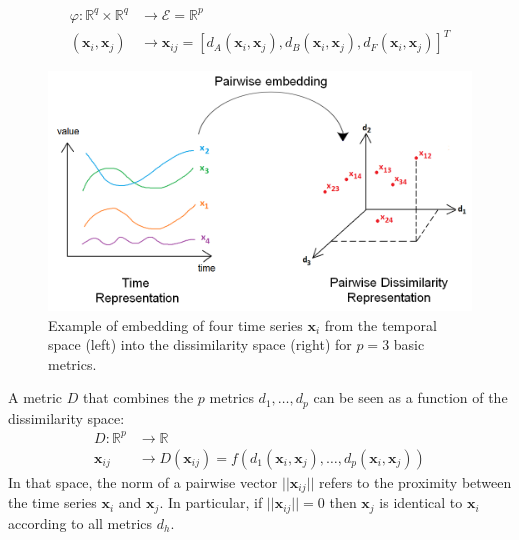 \begin{equation}
\begin{aligned}
\varphi : \mathbb{R}^q \times \mathbb{R}^q & \rightarrow \mathcal{E} = \mathbb{R}^p \\
(\textbf{x}_i, \textbf{x}_j) & \rightarrow \textbf{x}_{ij} = [d_A(\textbf{x}_i, \textbf{x}_j), d_B(\textbf{x}_i, \textbf{x}_j), d_F(\textbf{x}_i, \textbf{x}_j)]^T
\end{aligned}
\label{eq:projection}
\end{equation}

%
%

%

\begin{figure}[h!]
	\begin{minipage}[b]{1.0\linewidth}
		\centering
		\includegraphics[width=0.78\linewidth]{images/PairwiseEmbedding2}
	\end{minipage}
	\caption{Example of embedding of four time series $\textbf{x}_i$ from the temporal space (left) into the dissimilarity space (right) for $p=3$ basic metrics.}
	\label{fig:PairwiseEmbedding}
\end{figure}

\noindent A metric $D$ that combines the $p$ metrics $d_1, \ldots, d_p$ can be seen as a function of the dissimilarity space:
\begin{equation}
\begin{aligned}
D : \mathbb{R}^p & \rightarrow \mathbb{R} \\
\textbf{x}_{ij} & \rightarrow D(\textbf{x}_{ij}) = f(d_1(\textbf{x}_i, \textbf{x}_j), \ldots , d_p(\textbf{x}_i, \textbf{x}_j))
\end{aligned}
\label{eq:metric}
\end{equation}
In that space, the norm of a pairwise vector $||\textbf{x}_{ij}||$ refers to the proximity between the time series $\textbf{x}_i$ and $\textbf{x}_j$. In particular, if $||\textbf{x}_{ij}||=0$ then $\textbf{x}_j$ is identical to $\textbf{x}_i$ according to all metrics $d_h$. 

